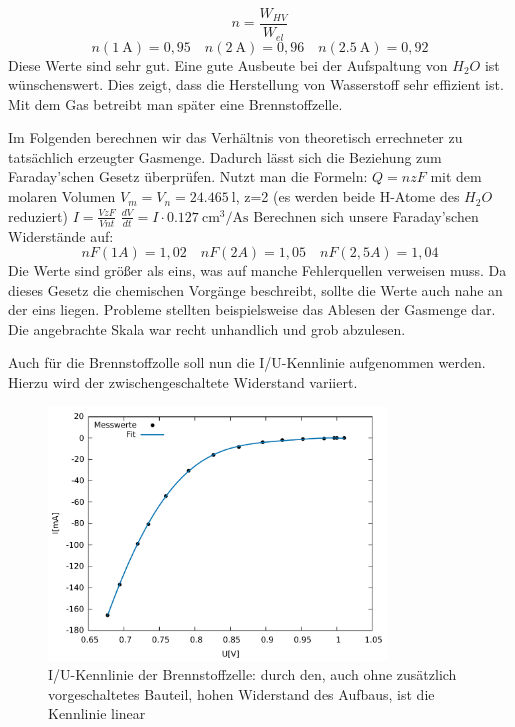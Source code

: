 \[ n=\frac{W_{HV}}{W_{el}} \]
\[
n(\SI{1}{\ampere})=0,95 \quad
n(\SI{2}{\ampere})=0,96 \quad
n(\SI{2,5}{\ampere})=0,92
\]
Diese Werte sind sehr gut. Eine gute Ausbeute bei der Aufspaltung von $H_2O$ ist wünschenswert.
Dies zeigt, dass die Herstellung von Wasserstoff sehr effizient ist. Mit dem Gas betreibt man später eine Brennstoffzelle.

Im Folgenden berechnen wir das Verhältnis von theoretisch errechneter zu tatsächlich erzeugter Gasmenge.
Dadurch lässt sich die Beziehung zum Faraday’schen Gesetz überprüfen. Nutzt man die Formeln:
$Q=nzF$
mit dem molaren Volumen $V_m=V_n=\SI{24,465}{\litre}$,
z=2 (es werden beide H-Atome des $H_2O$ reduziert)
$I=\frac{VzF}{Vnt}$
$\frac{dV}{dt}=I \cdot \SI{0.127}{\centi \meter \cubed \per \ampere \second}$
Berechnen sich unsere Faraday’schen Widerstände auf:
\[
nF(1A)=1,02 \quad nF(2A) = 1,05 \quad nF(2,5A)=1,04
\]
Die Werte sind größer als eins, was auf manche Fehlerquellen verweisen muss. Da dieses Gesetz die chemischen Vorgänge beschreibt, sollte die Werte auch nahe an der eins liegen.
Probleme stellten beispielsweise das Ablesen der Gasmenge dar.
Die angebrachte Skala war recht unhandlich und grob abzulesen.

Auch für die Brennstoffzolle soll nun die I/U-Kennlinie aufgenommen werden. Hierzu wird der zwischengeschaltete Widerstand variiert.
\begin{figure}
	\centering
	\includegraphics[width=0.8\textwidth]{mess/aufg10.pdf}
	\caption{I/U-Kennlinie der Brennstoffzelle: durch den, auch ohne zusätzlich vorgeschaltetes Bauteil, hohen Widerstand des Aufbaus, ist die Kennlinie linear}
	\label{a10}
\end{figure}

